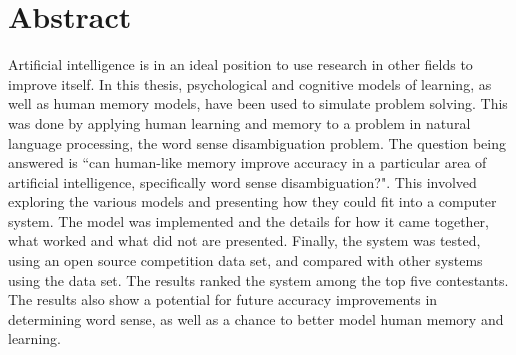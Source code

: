\doublespacing 
\chapter*{Abstract}

Artificial intelligence is in an ideal position to use research in other fields
to improve itself.  In this thesis, psychological and cognitive
models of learning, as well as human memory models, have been used to simulate problem
solving.  This was done by applying human learning and memory to a problem in
natural language processing, the word sense disambiguation problem. The question being 
answered is ``can human-like memory improve accuracy in a particular area of artificial
intelligence, specifically word sense disambiguation?". This involved exploring the 
various models and presenting how they could fit into a computer system.  The model was
implemented and the details for how it came together, what worked and what did not are
presented.  Finally, the system was tested, using an open source competition data set, 
and compared with other systems using the data set.  The results ranked the system among
the top five contestants. The results also show a potential for future accuracy 
improvements in determining word sense, as well as a chance to better model human memory 
and learning.
